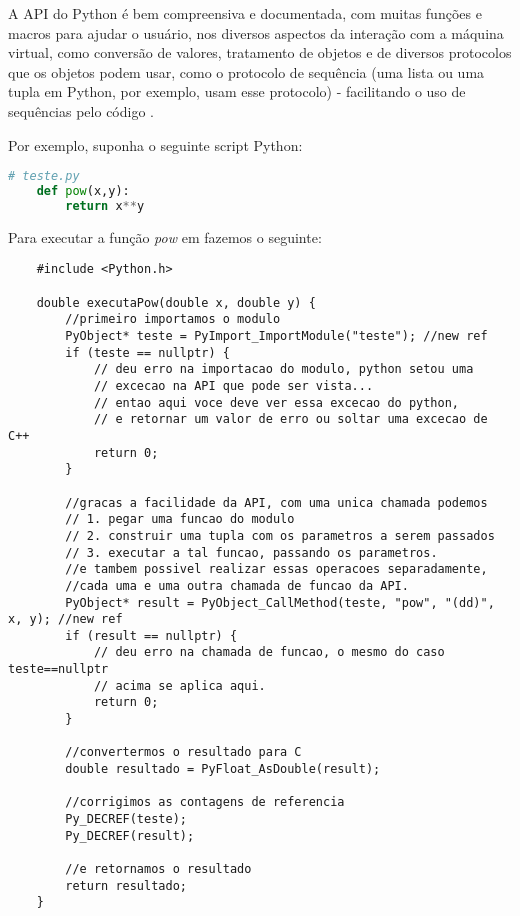     A API \C{} do Python é bem compreensiva e documentada, com muitas funções e macros para ajudar 
    o usuário, nos diversos aspectos da interação com a máquina virtual, como conversão de valores,
    tratamento de objetos e de diversos protocolos que os objetos podem usar, como o
    protocolo de sequência (uma lista ou uma tupla em Python, por exemplo, usam esse protocolo) -
    facilitando o uso de sequências pelo código \C{}.
    
    Por exemplo, suponha o seguinte script Python:
    \begin{lstlisting}[language=python]
    # teste.py
    def pow(x,y):
        return x**y
    \end{lstlisting}
    
    Para executar a função \emph{pow} em \CXX{} fazemos o seguinte:
    \begin{lstlisting}
    #include <Python.h>
    
    double executaPow(double x, double y) {
        //primeiro importamos o modulo
        PyObject* teste = PyImport_ImportModule("teste"); //new ref
        if (teste == nullptr) {
            // deu erro na importacao do modulo, python setou uma 
            // excecao na API que pode ser vista...
            // entao aqui voce deve ver essa excecao do python,
            // e retornar um valor de erro ou soltar uma excecao de C++
            return 0;
        }
        
        //gracas a facilidade da API, com uma unica chamada podemos
        // 1. pegar uma funcao do modulo
        // 2. construir uma tupla com os parametros a serem passados
        // 3. executar a tal funcao, passando os parametros.
        //e tambem possivel realizar essas operacoes separadamente,
        //cada uma e uma outra chamada de funcao da API.
        PyObject* result = PyObject_CallMethod(teste, "pow", "(dd)", x, y); //new ref
        if (result == nullptr) {
            // deu erro na chamada de funcao, o mesmo do caso teste==nullptr
            // acima se aplica aqui.
            return 0;
        }
        
        //convertermos o resultado para C
        double resultado = PyFloat_AsDouble(result);
        
        //corrigimos as contagens de referencia
        Py_DECREF(teste);
        Py_DECREF(result);
        
        //e retornamos o resultado
        return resultado;
    }
    \end{lstlisting}
    
